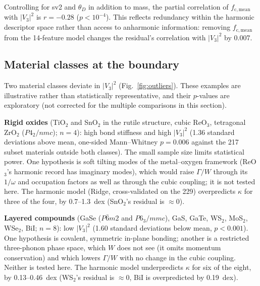 \documentclass[aps,prm,reprint,onecolumn,groupedaddress]{revtex4-2}
\begin{document}
Controlling for sv2 and $\theta_D$ in addition to mass, the partial correlation of $f_\mathrm{c,mean}$ with $|V_3|^2$ is $r = -0.28$ ($p < 10^{-4}$). This reflects redundancy within the harmonic descriptor space rather than access to anharmonic information: removing $f_\mathrm{c,mean}$ from the 14-feature model changes the residual's correlation with $|V_3|^2$ by 0.007.

\subsection{Material classes at the boundary}

Two material classes deviate in $|V_3|^2$ (Fig.~\ref{fig:outliers}). These examples are illustrative rather than statistically representative, and their $p$-values are exploratory (not corrected for the multiple comparisons in this section).

\textbf{Rigid oxides} (TiO$_2$ and SnO$_2$ in the rutile structure, cubic ReO$_3$, tetragonal ZrO$_2$ ($P4_2/nmc$); $n = 4$): high bond stiffness and high $|V_3|^2$ (1.36 standard deviations above mean, one-sided Mann--Whitney $p = 0.006$ against the 217 subset materials outside both classes). The small sample size limits statistical power. One hypothesis is soft tilting modes of the metal--oxygen framework (ReO$_3$'s harmonic record has imaginary modes), which would raise $\Gamma/W$ through its $1/\omega$ and occupation factors as well as through the cubic coupling; it is not tested here. The harmonic model (Ridge, cross-validated on the 229) overpredicts $\kappa$ for three of the four, by 0.7--1.3~dex (SnO$_2$'s residual is $\approx 0$).

\textbf{Layered compounds} (GaSe ($P\bar{6}m2$ and $P6_3/mmc$), GaS, GaTe, WS$_2$, MoS$_2$, WSe$_2$, BiI; $n = 8$): low $|V_3|^2$ (1.60 standard deviations below mean, $p < 0.001$). One hypothesis is covalent, symmetric in-plane bonding; another is a restricted three-phonon phase space, which $W$ does not see (it omits momentum conservation) and which lowers $\Gamma/W$ with no change in the cubic coupling. Neither is tested here. The harmonic model underpredicts $\kappa$ for six of the eight, by 0.13--0.46~dex (WS$_2$'s residual is $\approx 0$, BiI is overpredicted by 0.19~dex).
\end{document}
